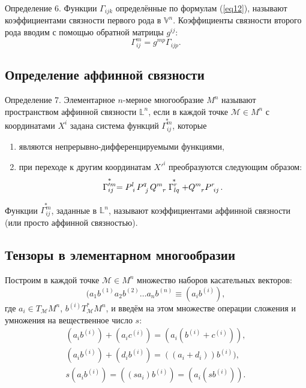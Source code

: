 \documentclass[14pt,a4paper]{extarticle}
\begin{document}
Определение 6. Функции $\Gamma_{ijk}$ определённые по формулам (\ref{eq12}), называют коэффициентами связности первого рода в $\mathbb{V}^n$. Коэффициенты связности второго рода вводим с помощью обратной матрицы $g^{ij}$:
\begin{equation}\label{eq13}
	\Gamma_{ij}^m = g^{mp}\Gamma_{ijp}.
\end{equation}


\subsection{Определение аффинной связности}
Определение 7. Элементарное $n$-мерное многообразие $M^n$ называют пространством аффинной связности $\mathbb{L}^n$, если в каждой точке $\mathcal{M} \in M^n$ с координатами $X^i$ задана система функций $\overset{*}{\Gamma_{ij}^m}$, которые
\begin{enumerate}
	\item являются непрерывно-дифференцируемыми функциями,
	\item при переходе к другим координатам $X'^i$ преобразуются следующим образом:
	\begin{equation}\label{eq14}
		\stackrel{*}{\Gamma_{ij}^{\prime m}}=P\indices{^{l}_{i}} P\indices{^{q}_{j}} Q\indices{^{m}_{r}} \stackrel{*}{\Gamma_{lq}^{r}}+Q\indices{^{m}_{r}} P\indices{^{r}_{i j}}.
	\end{equation}
\end{enumerate}

Функции $\overset{*}{\Gamma_{ij}^m}$, заданные в $\mathbb{L}^n$, называют коэффициентами аффинной связности (или просто аффинной связностью).

\subsection{Тензоры в элементарном многообразии}
Построим в каждой точке $\mathcal{M} \in M^n$ множество наборов касательных векторов:
\begin{equation}\label{eq15}
	(a_1b^{(1)}a_2b^{(2)}\ldots a_nb^{(n)} \equiv (a_ib^{(i)}),
\end{equation}
где $a_i \in T_{\mathcal{M}}M^n$, $b^{(i)} T_{\mathcal{M}}^*M^n$, и введём на этом множестве операции сложения и умножения на вещественное число $s$:
\begin{align}
	(a_ib^{(i)}) + (a_ic^{(i)}) = (a_i(b^{(i)} + c^{(i)})),\label{eq16}\\
	(a_ib^{(i)}) + (d_ib^{(i)}) = ((a_i+d_i)) b^{(i)}),\label{eq17}\\
	s(a_ib^{(i)}) = ((sa_i)b^{(i)}) = (a_i(sb^{(i)})). \label{eq18}
\end{align}
\end{document}
